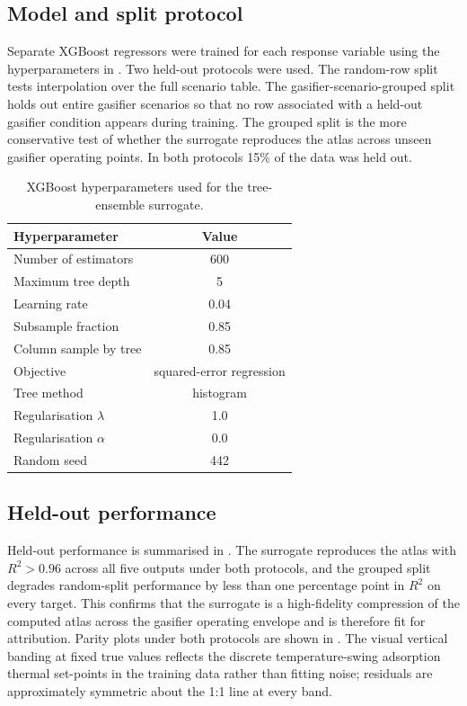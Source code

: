 \documentclass[11pt,a4paper]{article}
\newcommand{\TSA}{temperature-swing adsorption}
\begin{document}
\subsection{Model and split protocol}

Separate XGBoost regressors were trained for each response variable using
the hyperparameters in . Two held-out protocols were
used. The random-row split tests interpolation over the full scenario table.
The gasifier-scenario-grouped split holds out entire gasifier scenarios so
that no row associated with a held-out gasifier condition appears during
training. The grouped split is the more conservative test of whether the
surrogate reproduces the atlas across unseen gasifier operating points. In
both protocols 15\% of the data was held out.

\begin{table}[htbp]
\centering
\caption{XGBoost hyperparameters used for the tree-ensemble surrogate.}
\label{tabS:xgbparams}
\small
\begin{tabular}{lc}
\toprule
Hyperparameter & Value \\
\midrule
Number of estimators & 600 \\
Maximum tree depth & 5 \\
Learning rate & 0.04 \\
Subsample fraction & 0.85 \\
Column sample by tree & 0.85 \\
Objective & squared-error regression \\
Tree method & histogram \\
Regularisation $\lambda$ & 1.0 \\
Regularisation $\alpha$ & 0.0 \\
Random seed & 442 \\
\bottomrule
\end{tabular}
\end{table}

\subsection{Held-out performance}

Held-out performance is summarised in . The surrogate
reproduces the atlas with $R^2 > 0.96$ across all five outputs under both
protocols, and the grouped split degrades random-split performance by less
than one percentage point in $R^2$ on every target. This confirms that the
surrogate is a high-fidelity compression of the computed atlas across the
gasifier operating envelope and is therefore fit for attribution. Parity
plots under both protocols are shown in
. The visual vertical
banding at fixed true values reflects the discrete \TSA{} thermal set-points
in the training data rather than fitting noise; residuals are approximately
symmetric about the 1:1 line at every band.
\end{document}
